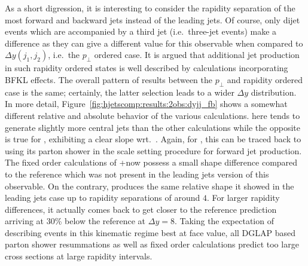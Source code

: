 As a short digression, it is interesting to consider the rapidity 
separation of the most forward and backward jets instead of the 
leading jets. Of course, only dijet events which are accompanied by 
a third jet (i.e.~three-jet events) make a difference as they can give
a different value for this observable when compared to $\Delta
y(j_1,j_2)$, i.e.~the $p_\perp$ ordered case. It is argued that
additional jet production in such rapidity ordered states is well
described by calculations incorporating BFKL effects.
The overall pattern of results between the $p_\perp$ and rapidity
ordered case is the same; certainly, the latter selection leads to a
wider $\Delta y$ distribution. In more detail,
Figure~\ref{fig:hjetscomp:results:2obs:dyjj_fb} shows a somewhat
different relative and absolute behavior of the various calculations.
\Powheg \NNLOPS here tends to generate slightly more 
central jets than the other calculations while the opposite is true 
for \Sherpa \MEPSatNLO, exhibiting a clear slope wrt.~\Powheg. Again,
for \Sherpa \MEPSatNLO, this can be traced back to using its parton
shower in the scale setting procedure for forward jet production. 
The fixed order calculations of \GoSam{}+\Sherpa now possess a small
shape difference compared to the \Powheg reference which was not
present in the leading jets version of this observable. On the
contrary, \Hej produces the same relative shape it showed in the 
leading jets case up to rapidity separations of around $4$. For
larger rapidity differences, it actually comes back to get closer to
the reference prediction arriving at 30\% below the reference at
$\Delta y=8$. Taking the expectation of \Hej describing events in 
this kinematic regime best at face value, all DGLAP based parton shower 
resummations as well as fixed order calculations predict too large 
cross sections at large rapidity intervals.

